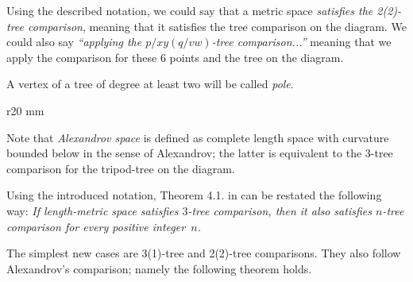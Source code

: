 Using the described notation, we could say that a metric space \emph{satisfies the 2(2)-tree comparison},  meaning that it satisfies the tree comparison on the diagram.
We could also say \emph{``applying the $p/xy(q/vw)$-tree comparison...''} meaning that we apply the comparison for these 6 points and the tree on the diagram.

A vertex of a tree of degree at least two will be called \emph{pole}.

\hide
\begin{wrapfigure}{r}{20 mm}
\end{wrapfigure}
\unhide

Note that \emph{Alexandrov space} is defined as complete length space with curvature bounded below in the sense of Alexandrov;
the latter is equivalent to the 3-tree comparison for the tripod-tree on the diagram. 

Using the introduced notation, Theorem 4.1. in \cite{AKP} can be restated the following way: \emph{If length-metric space satisfies $3$-tree comparison, then it also satisfies $n$-tree comparison for every positive integer~$n$.}

The simplest new cases are 3(1)-tree and 2(2)-tree comparisons.
They also follow Alexandrov's comparison;
namely the following theorem holds.

